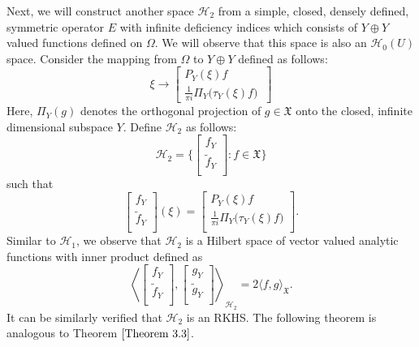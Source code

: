 \documentclass [12pt,reqno]{amsart}
\numberwithin{equation}{subsection}
\numberwithin{equation}{section}
\begin{document}
Next, we will construct another space $\mathcal{H}_2$ from a simple, closed, densely defined, symmetric operator $E$ with infinite deficiency indices which consists of $Y \oplus Y$ valued functions defined on $\Omega$. We will observe that this space is also an \( \mathcal{H}_0 (U) \) space. Consider the mapping from $\Omega$ to $Y \oplus Y$ defined as follows:
\begin{equation}
\xi \longrightarrow \begin{bmatrix}
P_{Y}(\xi)f \\
\frac{1}{\pi i} \Pi_{Y} \bigl(\tau_{Y}(\xi)f \bigl) \
\end{bmatrix}
\end{equation}
Here, $\Pi_{Y}(g)$ denotes the orthogonal projection of $g \in \mathfrak{X}$ onto the closed, infinite dimensional subspace $Y$.
Define $\mathcal{H}_2$ as follows: $$\mathcal{H}_2= \biggl \lbrace \begin{bmatrix} 
	f_Y  \\
	\tilde{f}_Y \\
	\end{bmatrix} : f \in \mathfrak{X}\biggl \rbrace$$ such that  $$\begin{bmatrix} 
	f_Y  \\
	\tilde{f}_Y \\
	\end{bmatrix}
	(\xi)=\begin{bmatrix} 
	P_{Y}(\xi)f  \\
	\frac{1}{\pi i} \Pi_{Y} \bigl(\tau_{Y}(\xi)f \bigl) \\
	\end{bmatrix}.$$
Similar to $\mathcal{H}_1$, we observe that $\mathcal{H}_2$ is a Hilbert space of vector valued analytic functions with inner product defined as \begin{equation}
	\left\langle   \begin{bmatrix} 
	f_Y  \\
	\tilde{f}_Y \\
	\end{bmatrix},   \begin{bmatrix} 
	g_Y  \\
	\tilde{g}_Y \\
	\end{bmatrix} \right\rangle_{\mathcal{H}_2} =2 \langle f,g \rangle_\mathfrak{X}.
	\end{equation}
It can be similarly verified that $\mathcal{H}_2$ is an RKHS. The following theorem is analogous to Theorem $\ref{Theorem 3.3}$.
\end{document}
